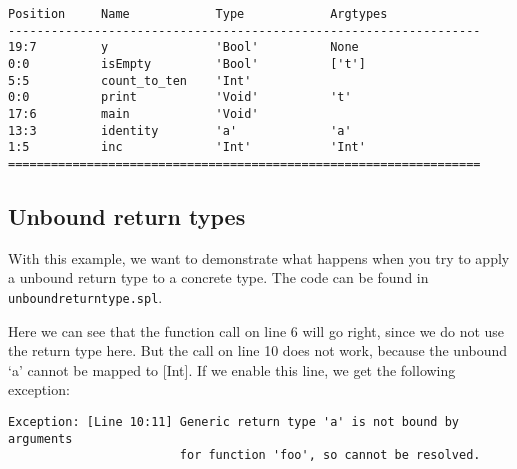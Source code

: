 \documentclass[a4paper]{article}
\begin{document}
\begin{verbatim}
Position     Name            Type            Argtypes            
------------------------------------------------------------------
19:7         y               'Bool'          None                
0:0          isEmpty         'Bool'          ['t']               
5:5          count_to_ten    'Int'                               
0:0          print           'Void'          't'                 
17:6         main            'Void'                              
13:3         identity        'a'             'a'                 
1:5          inc             'Int'           'Int'               
==================================================================
\end{verbatim}


\subsection{Unbound return types}
With this example, we want to demonstrate what happens when you try to apply a unbound return type to a concrete type. The code can be found in {\tt unboundreturntype.spl}. 

Here we can see that the function call on line 6 will go right, since we do not use the return type here. But the call on line 10 does not work, because the unbound `a' cannot be mapped to [Int]. If we enable this line, we get the following exception: 

\begin{verbatim}
Exception: [Line 10:11] Generic return type 'a' is not bound by arguments 
                        for function 'foo', so cannot be resolved.
\end{verbatim}
\end{document}

